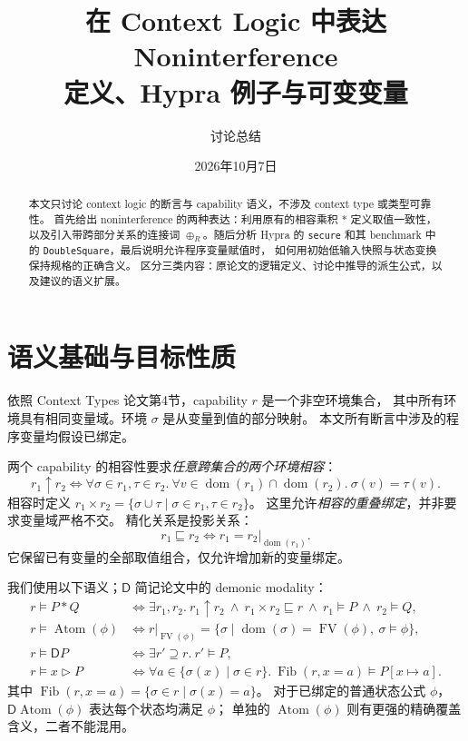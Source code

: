 \documentclass[UTF8,a4paper,11pt,fontset=fandol]{ctexart}
\title{在 Context Logic 中表达 Noninterference\\\large 定义、Hypra 例子与可变变量}
\author{讨论总结}
\date{2026年10月7日}
\newcommand{\Atom}{\operatorname{Atom}}
\newcommand{\dom}{\operatorname{dom}}
\newcommand{\FV}{\operatorname{FV}}
\newcommand{\Fib}{\operatorname{Fib}}
\newcommand{\D}{\mathsf{D}}
\newcommand{\sat}{\models}
\newcommand{\eqv}{\Longleftrightarrow}
\begin{document}
\maketitle
\begin{abstract}
本文只讨论 context logic 的断言与 capability 语义，不涉及 context type 或类型可靠性。
首先给出 noninterference 的两种表达：利用原有的相容乘积 $*$ 定义取值一致性，
以及引入带跨部分关系的连接词 $\oplus_R$。随后分析 Hypra 的 \texttt{secure}
和其 benchmark 中的 \texttt{DoubleSquare}，最后说明允许程序变量赋值时，
如何用初始低输入快照与状态变换保持规格的正确含义。
区分三类内容：原论文的逻辑定义、讨论中推导的派生公式，以及建议的语义扩展。
\end{abstract}

\section{语义基础与目标性质}

依照 Context Types 论文第4节\cite{context}，capability $r$ 是一个非空环境集合，
其中所有环境具有相同变量域。环境 $\sigma$ 是从变量到值的部分映射。
本文所有断言中涉及的程序变量均假设已绑定。

两个 capability 的相容性要求\emph{任意跨集合的两个环境相容}：
\[
 r_1\mathrel{\uparrow}r_2
 \eqv
 \forall\sigma\in r_1,\tau\in r_2.\
 \forall v\in\dom(r_1)\cap\dom(r_2).\ \sigma(v)=\tau(v).
\]
相容时定义 $r_1\times r_2=\{\sigma\cup\tau\mid\sigma\in r_1,\tau\in r_2\}$。
这里允许\emph{相容的重叠绑定}，并非要求变量域严格不交。
精化关系是投影关系：
\[
 r_1\sqsubseteq r_2
 \eqv r_1=r_2\big|_{\dom(r_1)}.
\]
它保留已有变量的全部取值组合，仅允许增加新的变量绑定。

我们使用以下语义；$\D$ 简记论文中的 demonic modality：
\begin{align*}
 r\sat P*Q
 &\eqv \exists r_1,r_2.\ r_1\uparrow r_2\ \land\
 r_1\times r_2\sqsubseteq r\ \land\ r_1\sat P\ \land\ r_2\sat Q,\\
 r\sat\Atom(\phi)
 &\eqv r\big|_{\FV(\phi)}
 =\{\sigma\mid\dom(\sigma)=\FV(\phi),\ \sigma\sat\phi\},\\
 r\sat\D P
 &\eqv \exists r'\supseteq r.\ r'\sat P,\\
 r\sat x\triangleright P
 &\eqv \forall a\in\{\sigma(x)\mid\sigma\in r\}.\
 \Fib(r,x=a)\sat P[x\mapsto a].
\end{align*}
其中 $\Fib(r,x=a)=\{\sigma\in r\mid\sigma(x)=a\}$。
对于已绑定的普通状态公式 $\phi$，$\D\Atom(\phi)$ 表达每个状态均满足 $\phi$；
单独的 $\Atom(\phi)$ 则有更强的精确覆盖含义，二者不能混用。
\end{document}
